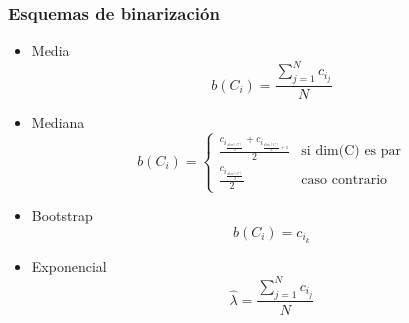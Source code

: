 		\begin{frame}
			\frametitle{Esquemas de binarización}
			\begin{itemize}
				\item<1-> Media
					$$b(C_i) = \frac{\sum_{j=1}^N c_{i_j}}{N} $$
				\item<2-> Mediana
	\[
    		b(C_i) = 
		\begin{cases}
    			\frac{c_{i_{\frac{dim(C)}{2}}} + c_{i_{\frac{dim(C)}{2}+1}}}{2} & \text{si dim(C) es par}\\
    			\frac{c_{i_{\frac{dim(C)}{2}}}}{2} & \text{caso contrario}
		\end{cases}
	\]
				\item<3-> Bootstrap
					$$ b(C_i) = c_{i_k} $$
				\item<4-> Exponencial
					$$\hat{\lambda} = \frac{\sum_{j=1}^N c_{i_j}}{N} $$
			\end{itemize}
		\end{frame}